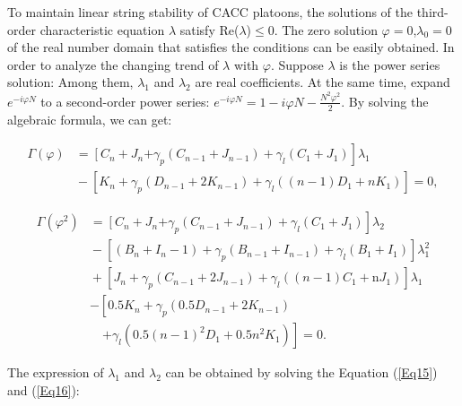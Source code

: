 \documentclass[journal]{IEEEtran}
\begin{document}
To maintain linear string stability of CACC platoons, the solutions of the third-order characteristic equation $\lambda$ satisfy Re($\lambda$)$\leq$0. The zero solution $\varphi=0$,$\lambda_0=0$ of the real number domain that satisfies the conditions can be easily obtained. In order to analyze the changing trend of $\lambda$ with $\varphi$. Suppose $\lambda$ is the power series solution: Among them, $\lambda_1$ and $\lambda_2$ are real coefficients. At the same time, expand $e^{-i \varphi N}$ to a second-order power series: $e^{-i \varphi N}=1-i \varphi N-\frac{N^{2} \varphi^{2}}{2}$. By solving the algebraic formula, we can get:

\begin{small}
\begin{equation}
\begin{aligned}
\Gamma(\varphi)&=\left[C_{n}+J_{n}\right.\left.+\gamma_{p}\left(C_{n-1}+J_{n-1}\right)+\gamma_{l}\left(C_{1}+J_{1}\right)\right] \lambda_{1} \\
&\!-\!\left[K_{n}\!+\!\gamma_{p}\left(D_{n-1}\!+\!2 K_{n-1}\right)\!+\!\gamma_{l}\left((n-1) D_{1}\!+\!n K_{1}\right)\right]\!=\!0,
\end{aligned}
\label{Eq15}
\end{equation}
\end{small}

\begin{small}
\begin{equation}
\begin{aligned}
\Gamma\left(\varphi^{2}\right)&=\left[C_{n}+J_{n}\right.\left.+\gamma_{p}\left(C_{n-1}+J_{n-1}\right)+\gamma_{l}\left(C_{1}+J_{1}\right)\right] \lambda_{2} \\
&\!-\!\left[\left(B_{n}\!+\!I_{n}-1\right)\!+\!\gamma_{p}\left(B_{n-1}\!+\!I_{n-1}\right)\!+\!\gamma_{l}\left(B_{1}\!+\!I_{1}\right)\right] \lambda_{1}^{2} \\
&\!+\!\left[J_{n}\!+\!\gamma_{p}\left(C_{n-1}\!+\!2 J_{n-1}\right)\!+\!\gamma_{l}\left((n-1) C_{1}\!+\!\mathrm{n} J_{1}\right)\right] \lambda_{1} \\
&-\left[0.5 K_{n}+\gamma_{p}\left(0.5 D_{n-1}+2 K_{n-1}\right)\right.\\
&\quad\left.+\gamma_{l}\left(0.5(n-1)^{2} D_{1}+0.5 n^{2} K_{1}\right)\right]=0.
\end{aligned}
\label{Eq16}
\end{equation}
\end{small}

The expression of $\lambda_1$ and $\lambda_2$ can be obtained by solving the Equation (\ref{Eq15}) and (\ref{Eq16}):
\end{document}
